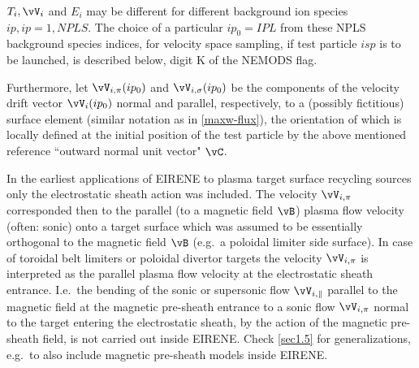 $T_i,\vV_i$ and $E_i$ may be different for different background ion species
$ip,  ip = 1,NPLS$.
The choice of a particular $ip_0=IPL$ from these NPLS background species
indices, for velocity space sampling, if test particle $isp$ is to be launched,
is described below, digit K of the NEMODS flag.

Furthermore, let $\vV_{i,\pi}(ip_0)$ and $\vV_{i,\sigma}(ip_0)$ be the
components of the velocity drift vector $\vV_i(ip_0)$ normal and parallel,
respectively, to a (possibly fictitious) surface element (similar  notation as
in \cref{maxw-flux}), the orientation of which is locally defined at the
initial position of the test particle by the above mentioned reference
``outward normal unit vector" $\vC$.

In the earliest applications of EIRENE to plasma target surface recycling
sources only the electrostatic sheath action was included.
The velocity $\vV_{i,\pi}$ corresponded then to the parallel (to a magnetic
field $\vB$) plasma flow velocity (often: sonic) onto a target surface which
was assumed to be essentially orthogonal to the magnetic field $\vB$ (e.g.\ a
poloidal limiter side surface).
In case of toroidal belt limiters or poloidal divertor targets the velocity
$\vV_{i,\pi}$ is interpreted as the parallel plasma flow velocity at the
electrostatic sheath entrance.
I.e.\ the bending of the sonic or supersonic flow $\vV_{i,\|}$ parallel to the
magnetic field at the magnetic pre-sheath entrance to a sonic flow
$\vV_{i,\pi}$ normal to the target entering the electrostatic sheath, by the
action of the magnetic pre-sheath field, is not carried out inside EIRENE.
Check \cref{sec1.5} for generalizations, e.g.\ to also include magnetic
pre-sheath models inside EIRENE.

